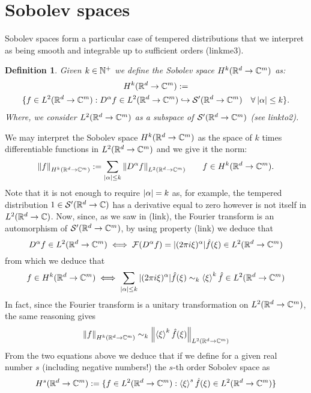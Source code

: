 \documentclass[12pt]{article}
\newtheorem{definition}{Definition}
\newcommand{\br}[1]{\left\langle#1\right\rangle}
\begin{document}
\bigbreak
\section{Sobolev spaces}
Sobolev spaces form a particular case of tempered distributions that we interpret as being smooth and integrable up to sufficient orders (linkme3).
\begin{definition}\label{sobolevdef}
	Given $k\in\mathbb{N}^+$ we define the \emph{Sobolev space} $H^k({\mathbb R}^d\to\mathbb{C}^m)$ as:
	\begin{multline*}
		H^k({\mathbb R}^d\to\mathbb{C}^m):=\\ \lbrace f\in L^2({\mathbb R}^d\to\mathbb{C}^m): D^\alpha f\in L^2({\mathbb R}^d\to\mathbb{C}^m)\hookrightarrow{\mathcal S} '({\mathbb R}^d\to\mathbb{C}^m)\quad\forall\hspace{2pt}\abs{\alpha}\leq k\rbrace.
	\end{multline*}
	Where,  we consider $L^2({\mathbb R}^d\to\mathbb{C}^m)$ as a subspace of ${\mathcal S} '({\mathbb R}^d\to\mathbb{C}^m)$ (see linkto2).\end{definition} We may interpret the Sobolev space $H^k({\mathbb R}^d\to\mathbb{C}^m)$ as the space of $k$ times differentiable functions in $L^2({\mathbb R}^d\to\mathbb{C}^m)$ and we give it the norm:
\[\norm{f}_{H^k({\mathbb R}^d\to\mathbb{C}^m)}:=\sum_{\abs{\alpha}\leq k}\norm{D^\alpha f}_{L^2({\mathbb R}^d\to\mathbb{C}^m)}\qquad f\in H^k({\mathbb R}^d\to\mathbb{C}^m).\]
Note that it is not enough to require $\abs{\alpha}=k$ as, for example, the tempered distribution $1 \in {\mathcal S}'({\mathbb R}^d\to\mathbb{C})$ has a derivative equal to zero however is not itself in $L^2({\mathbb R}^d\to\mathbb{C})$. Now, since, as we saw in (link), the Fourier transform is an automorphism of ${\mathcal S}'({\mathbb R}^d\to\mathbb{C}^m)$, by using property (link)  we deduce that
\[D^\alpha f\in L^2({\mathbb R}^d\to\mathbb{C}^m)\iff \mathcal{F} (D^\alpha f)=\abs{(2\pi i\xi )^{\alpha}} \hat{f}(\xi)\in L^2({\mathbb R}^d\to\mathbb{C}^m)\]
from which we deduce that
\begin{equation}\label{sobolevcondition}
	f\in H^k(\R^d\to\C^m)\iff \sum_{\abs{\alpha}\leq k} \abs{(2\pi i\xi )^{\alpha}}\hat{f}(\xi)\sim_k \br{\xi}^k\hat{f}\in L^2(\R^d\to\C^m)
\end{equation}
In fact, since the Fourier transform is a unitary transformation on $L^2({\mathbb R}^d\to\mathbb{C}^m)$, the same reasoning gives
\begin{equation}\label{sobolevnorm}
	\norm{f}_{H^k(\R^d\to\C^m)}\sim_k \norm{\br{\xi}^k\hat{f}(\xi)}_{L^2(\R^d\to\C^m)}
\end{equation}
From the two equations above we deduce that if we define for a given real number $s$ (including negative numbers!) the $s$-th order Sobolev space as
\[H^s(\R^d\to\C^m):=\lbrace f\in L^2(\R^d\to\C^m): \br{\xi}^s\hat{f}(\xi)\in L^2(\R^d\to\C^m)\rbrace\]
\end{document}
